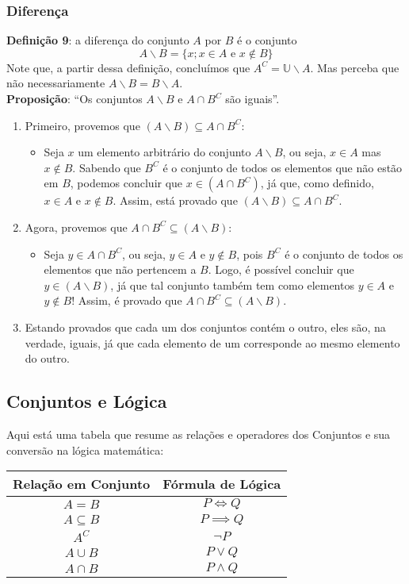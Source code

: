 \documentclass{article}
\begin{document}
\subsubsection{Diferença}
\textbf{Definição 9}: a diferença do conjunto $A$ por $B$ é o conjunto
\begin{displaymath}
    A \backslash B = \{x; x \in A \text{ e } x \notin B \}
\end{displaymath}
Note que, a partir dessa definição, concluímos que $A^C = \mathbb{U} \backslash A$. Mas perceba que não necessariamente $A \backslash B = B \backslash A$. 
\\
\textbf{Proposição}: \enquote{Os conjuntos $A \backslash B$ e $A \cap B^C$ são iguais}.
\begin{enumerate}
    \item Primeiro, provemos que $(A \backslash B) \subseteq A \cap B^C$:
    \begin{itemize}
        \item Seja $x$ um elemento arbitrário do conjunto $A \backslash B$, ou seja, $x \in A$ mas $x \notin B$. Sabendo que $B^C$ é o conjunto de todos os elementos que não estão em $B$, podemos concluir que $x \in (A \cap B^C)$, já que, como definido, $x \in A$ e $x \notin B$. Assim, está provado que $(A \backslash B) \subseteq A \cap B^C$.
    \end{itemize}
    \item Agora, provemos que $A \cap B^C \subseteq (A \backslash B)$:
    \begin{itemize}
        \item Seja $y \in A \cap B^C$, ou seja, $y \in A$ e $y \notin B$, pois $B^C$ é o conjunto de todos os elementos que não pertencem a $B$. Logo, é possível concluir que $y \in (A \backslash B)$, já que tal conjunto também tem como elementos $y \in A$ e $y \notin B$! Assim, é provado que $A \cap B^C \subseteq (A \backslash B)$.
    \end{itemize}
    \item Estando provados que cada um dos conjuntos contém o outro, eles são, na verdade, iguais, já que cada elemento de um corresponde ao mesmo elemento do outro.
\end{enumerate}
\subsection{Conjuntos e Lógica}
Aqui está uma tabela que resume as relações e operadores dos Conjuntos e sua conversão na lógica matemática:
\begin{center}
    \begin{tabular}{c|c}
        Relação em Conjunto & Fórmula de Lógica  \\
        \hline
        $A = B$ & $P \iff Q$ \\
        $A \subseteq B$ & $P \implies Q $\\
        $A^C $ & $ \lnot P$ \\
        $A \cup B$ & $P \vee Q $ \\
        $ A \cap B$ & $P \land Q $ \\
    \end{tabular}
\end{center}
\end{document}
